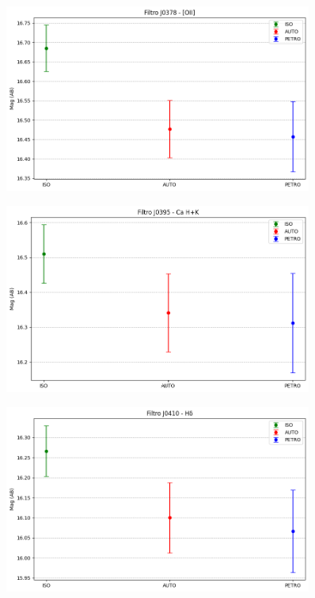 \begin{anexosenv}
    \begin{figure}[h]
        \centering
        \includegraphics[width=0.9\textwidth]{Imagens/incerteza_abertura_J0378.png} 
        \caption[]{}
        \label{fig:incerteza_abertura_J0378} 
    \end{figure}

    \begin{figure}[h]
        \centering
        \includegraphics[width=0.9\textwidth]{Imagens/incerteza_abertura_J0395.png} 
        \caption[]{}
        \label{fig:incerteza_abertura_J0395} 
    \end{figure}

    \begin{figure}[h]
        \centering
        \includegraphics[width=0.9\textwidth]{Imagens/incerteza_abertura_J0410.png} 
        \caption[]{}
        \label{fig:incerteza_abertura_J0410} 
    \end{figure}


\end{anexosenv}
